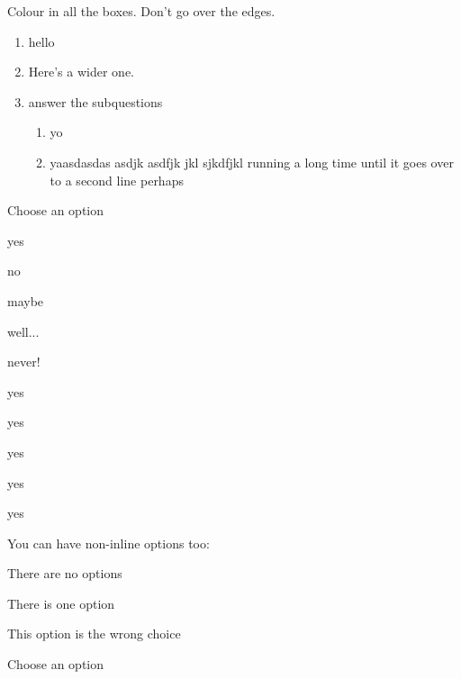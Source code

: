 \documentclass{ouicma}
\begin{document}
\maketitle


\question
Colour in all the boxes. Don't go over the edges.
 
\begin{enumerate}
\item hello \bigskip\answerbox
\item Here's a wider one.\bigskip \wideanswerbox
\item answer the subquestions
\begin{enumerate}
\item yo\medskip \answerbox 
\item yaasdasdas asdjk asdfjk jkl sjkdfjkl  running a long time until it goes over to a second line perhaps\wideanswerbox
\end{enumerate}
\end{enumerate}


\question

Choose an option

\begin{inlineoptions}{5}%
\item yes
\item no
\item maybe
\item well...
\item never!
\item yes
\item yes
\item yes
\item yes
\item yes\answerbox
\end{inlineoptions}

\question
You can have non-inline options too:
\begin{options}
\item There are no options
\item There is one option
\item This option is the wrong choice\answerbox
\end{options}

\question

Choose an option
\end{document}
